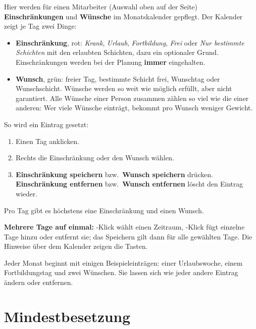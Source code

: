\documentclass[11pt]{combiArticle}
\newcommand{\taste}[1]{\fbox{\small\strut #1}}
\newcommand{\knopf}[1]{\textbf{#1}}
\begin{document}
Hier werden für einen Mitarbeiter (Auswahl oben auf der Seite) \textbf{Einschränkungen} und \textbf{Wünsche}
im Monatskalender gepflegt. Der Kalender zeigt je Tag zwei Dinge:
\begin{itemize}
  \item \textbf{Einschränkung}, rot: \emph{Krank}, \emph{Urlaub}, \emph{Fortbildung}, \emph{Frei}
        oder \emph{Nur bestimmte Schichten} mit den erlaubten Schichten, dazu ein optionaler Grund.
        Einschränkungen werden bei der Planung \textbf{immer} eingehalten.
  \item \textbf{Wunsch}, grün: freier Tag, bestimmte Schicht frei, Wunschtag oder Wunschschicht. Wünsche werden
        so weit wie möglich erfüllt, aber nicht garantiert. Alle Wünsche einer Person zusammen zählen so viel wie
        die einer anderen: Wer viele Wünsche einträgt, bekommt pro Wunsch weniger Gewicht.
\end{itemize}
So wird ein Eintrag gesetzt:
\begin{enumerate}
  \item Einen Tag anklicken.
  \item Rechts die Einschränkung oder den Wunsch wählen.
  \item \knopf{Einschränkung speichern} bzw.\ \knopf{Wunsch speichern} drücken. \knopf{Einschränkung entfernen}
        bzw.\ \knopf{Wunsch entfernen} löscht den Eintrag wieder.
\end{enumerate}
Pro Tag gibt es höchstens eine Einschränkung und einen Wunsch.

\textbf{Mehrere Tage auf einmal:} \taste{Umschalt}-Klick wählt einen Zeitraum, \taste{ctrl}-Klick fügt einzelne
Tage hinzu oder entfernt sie; das Speichern gilt dann für alle gewählten Tage. Die Hinweise über dem Kalender
zeigen die Tasten.

Jeder Monat beginnt mit einigen Beispieleinträgen: einer Urlaubswoche, einem Fortbildungstag und zwei Wünschen.
Sie lassen sich wie jeder andere Eintrag ändern oder entfernen.

\section{Mindestbesetzung}\label{sec:bedarf}
\end{document}
